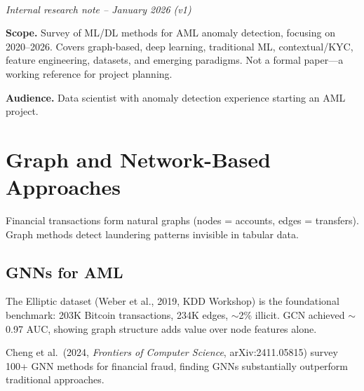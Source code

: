 \documentclass[11pt]{article}
\begin{document}
\\[2pt]
{\itshape Internal research note -- January 2026 (v1)}

\medskip

\textbf{Scope.} Survey of ML/DL methods for AML anomaly detection, focusing on 2020--2026. Covers graph-based, deep learning, traditional ML, contextual/KYC, feature engineering, datasets, and emerging paradigms. Not a formal paper---a working reference for project planning.

\textbf{Audience.} Data scientist with anomaly detection experience starting an AML project.

\bigskip
{}
\medskip
\setcounter{tocdepth}{1}
\makeatletter
{}
\makeatother

\newpage

\section{Graph and Network-Based Approaches}

Financial transactions form natural graphs (nodes = accounts, edges = transfers). Graph methods detect laundering patterns invisible in tabular data.

\subsection{GNNs for AML}

The Elliptic dataset (Weber et al., 2019, KDD Workshop) is the foundational benchmark: 203K Bitcoin transactions, 234K edges, $\sim$2\% illicit. GCN achieved $\sim$0.97 AUC, showing graph structure adds value over node features alone.

Cheng et al.\ (2024, \textit{Frontiers of Computer Science}, arXiv:2411.05815) survey 100+ GNN methods for financial fraud, finding GNNs substantially outperform traditional approaches.
\end{document}
